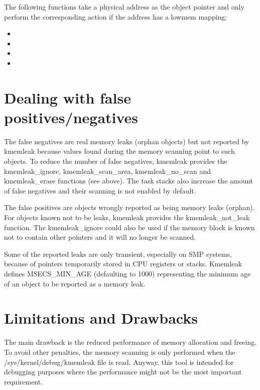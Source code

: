 \documentclass[a4paper,8pt,english]{sphinxmanual}
\begin{document}
The following functions take a physical address as the object pointer
and only perform the corresponding action if the address has a lowmem
mapping:
\begin{itemize}
\item {} 

\item {} 

\item {} 

\item {} 

\end{itemize}


\section{Dealing with false positives/negatives}
\label{dev-tools/kmemleak:dealing-with-false-positives-negatives}
The false negatives are real memory leaks (orphan objects) but not
reported by kmemleak because values found during the memory scanning
point to such objects. To reduce the number of false negatives, kmemleak
provides the kmemleak\_ignore, kmemleak\_scan\_area, kmemleak\_no\_scan and
kmemleak\_erase functions (see above). The task stacks also increase the
amount of false negatives and their scanning is not enabled by default.

The false positives are objects wrongly reported as being memory leaks
(orphan). For objects known not to be leaks, kmemleak provides the
kmemleak\_not\_leak function. The kmemleak\_ignore could also be used if
the memory block is known not to contain other pointers and it will no
longer be scanned.

Some of the reported leaks are only transient, especially on SMP
systems, because of pointers temporarily stored in CPU registers or
stacks. Kmemleak defines MSECS\_MIN\_AGE (defaulting to 1000) representing
the minimum age of an object to be reported as a memory leak.


\section{Limitations and Drawbacks}
\label{dev-tools/kmemleak:limitations-and-drawbacks}
The main drawback is the reduced performance of memory allocation and
freeing. To avoid other penalties, the memory scanning is only performed
when the /sys/kernel/debug/kmemleak file is read. Anyway, this tool is
intended for debugging purposes where the performance might not be the
most important requirement.
\end{document}
